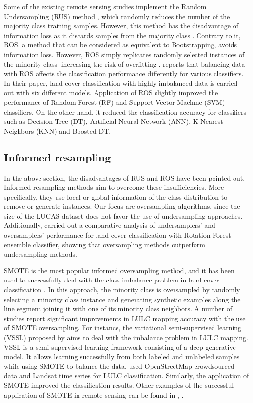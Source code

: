 \documentclass[remotesensing,article,submit,moreauthors,pdftex]{Definitions/mdpi}
\begin{document}
Some of the existing remote sensing studies implement the Random Undersampling
(RUS) method \cite{Azadbakht2016}, which randomly reduces the number of the
majority class training samples. However, this method has the disadvantage of
information loss as it discards samples from the majority class
\cite{Feng2019}. Contrary to it, ROS, a method that can be considered as
equivalent to Bootstrapping, avoids information loss. However, ROS simply
replicates randomly selected instances of the minority class, increasing the
risk of overfitting \cite{Krawczyk2016}. \cite{Maxwell2018} reports that
balancing data with ROS affects the classification performance differently for
various classifiers. In their paper, land cover classification with highly
imbalanced data is carried out with six different models. Application of ROS
slightly improved the performance of Random Forest (RF) and Support Vector
Machine (SVM) classifiers. On the other hand, it reduced the classification
accuracy for classifiers such as Decision Tree (DT), Artificial Neural Network
(ANN), K-Nearest Neighbors (KNN) and Boosted DT.

\subsection{Informed resampling}

In the above section, the disadvantages of RUS and ROS have been pointed out.
Informed resampling methods aim to overcome these insufficiencies. More
specifically, they use local or global information of the class distribution to
remove or generate instances. Our focus are oversampling algorithms, since the
size of the LUCAS dataset does not favor the use of undersampling approaches.
Additionally, \cite{Feng2018} carried out a comparative analysis of
undersamplers' and oversamplers' performance for land cover classification with
Rotation Forest ensemble classifier, showing that oversampling methods
outperform undersampling methods.

SMOTE is the most popular informed oversampling method, and it has been used to
successfully deal with the class imbalance problem in land cover classification
\cite{Cenggoro2018}. In this approach, the minority class is oversampled by
randomly selecting a minority class instance and generating synthetic examples
along the line segment joining it with one of its minority class neighbors. A
number of studies report significant improvements in LULC mapping accuracy with
the use of SMOTE oversampling. For instance, the variational semi-supervised
learning (VSSL) proposed by \cite{Cenggoro2018} aims to deal with the imbalance
problem in LULC mapping. VSSL is a semi-supervised learning framework consisting
of a deep generative model. It allows learning successfully from both labeled
and unlabeled samples while using SMOTE to balance the data. \cite{Johnson2016}
used OpenStreetMap crowdsourced data and Landsat time series for LULC
classification. Similarly, the application of SMOTE improved the classification
results. Other examples of the successful application of SMOTE in remote sensing
can be found in \cite{Bogner2018}, \cite{Panda2018}.
\end{document}
